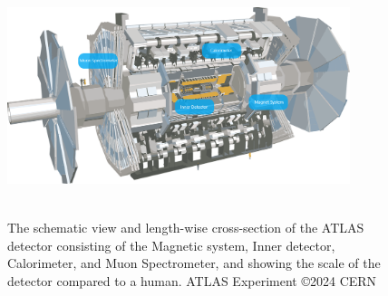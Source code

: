 \begin{figure}[h]
    \centering
    \includegraphics[width=10cm,height=7cm,keepaspectratio]{Figures/Intro/Detector reduce.png}
    \caption{The schematic view and length-wise cross-section of the ATLAS detector consisting of the Magnetic system, Inner detector, Calorimeter, and Muon Spectrometer, and showing the scale of the detector compared to a human. ATLAS Experiment  \copyright 2024 CERN}
    \label{fig:ATLASdetector}
\end{figure}

